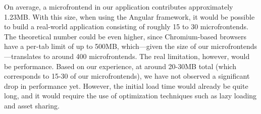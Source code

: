 On average, a microfrontend in our application contributes approximately 1.23MB. With this size, when using the Angular framework, it would be possible to build a real-world application consisting of roughly 15 to 30 microfrontends. The theoretical number could be even higher, since Chromium-based browsers have a per-tab limit of up to 500MB, which—given the size of our microfrontends—translates to around 400 microfrontends. The real limitation, however, would be performance. Based on our experience, at around 20-30MB total (which corresponds to 15-30 of our microfrontends), we have not observed a significant drop in performance yet. However, the initial load time would already be quite long, and it would require the use of optimization techniques such as lazy loading and asset sharing.